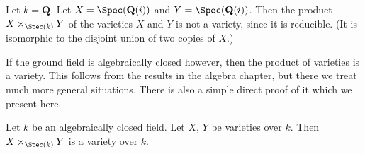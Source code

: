 \begin{example}
\label{example-product-not-a-variety}
Let $k = \mathbf{Q}$. Let $X = \Spec(\mathbf{Q}(i))$
and $Y = \Spec(\mathbf{Q}(i))$. Then the product
$X \times_{\Spec(k)} Y$ of the varieties $X$ and $Y$
is not a variety, since it is reducible. (It is isomorphic
to the disjoint union of two copies of $X$.)
\end{example}

\noindent
If the ground field is algebraically closed however, then the
product of varieties is a variety. This follows from the results
in the algebra chapter, but there we treat much more general situations.
There is also a simple direct proof of it which we present here.

\begin{lemma}
\label{lemma-product-varieties}
Let $k$ be an algebraically closed field.
Let $X$, $Y$ be varieties over $k$.
Then $X \times_{\Spec(k)} Y$ is a variety over $k$.
\end{lemma}

